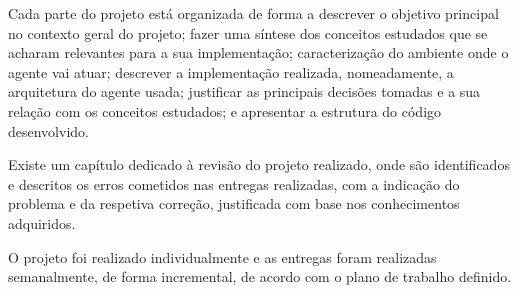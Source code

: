 Cada parte do projeto está organizada de forma a descrever o objetivo principal no contexto geral do projeto; fazer uma síntese dos conceitos estudados que se acharam relevantes para a sua implementação; caracterização do ambiente onde o agente vai atuar; descrever a implementação realizada, nomeadamente, a arquitetura do agente usada; justificar as principais decisões tomadas e a sua relação com os conceitos estudados; e apresentar a estrutura do código desenvolvido.

Existe um capítulo dedicado à revisão do projeto realizado, onde são identificados e descritos os erros cometidos nas entregas realizadas, com a indicação do problema e da respetiva correção, justificada com base nos conhecimentos adquiridos.

O projeto foi realizado individualmente e as entregas foram realizadas semanalmente, de forma incremental, de acordo com o plano de trabalho definido.

